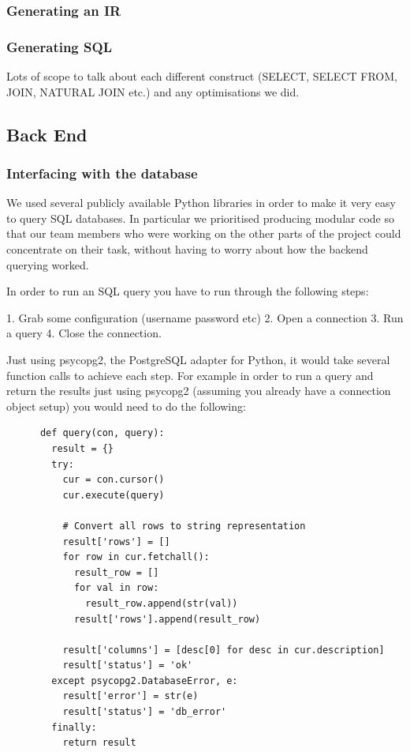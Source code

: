 \documentclass[a4paper, 11pt]{article}
\begin{document}
    \subsubsection{Generating an IR}

    \subsubsection{Generating SQL}
      Lots of scope to talk about each different construct (SELECT, SELECT FROM, 
      JOIN, NATURAL JOIN etc.) and any optimisations we did.

    \subsection{Back End}


    \subsubsection{Interfacing with the database}

      We used several publicly available Python libraries in order to make 
      it very easy to query SQL databases. In particular we prioritised
      producing modular code so that our team members who were working on the
      other parts of the project could concentrate on their task, without having
      to worry about how the backend querying worked.

      In order to run an SQL query you have to run through the following steps:

      1. Grab some configuration (username password etc)
      2. Open a connection
      3. Run a query
      4. Close the connection.

      Just using psycopg2, the PostgreSQL adapter for Python, it would take
      several function calls to achieve each step. For example in order to run a
      query and return the results just using psycopg2 (assuming you already
      have a connection object setup) you would need to do the following:

      \begin{verbatim}
      def query(con, query):
        result = {}
        try:
          cur = con.cursor()
          cur.execute(query)

          # Convert all rows to string representation
          result['rows'] = []
          for row in cur.fetchall():
            result_row = []
            for val in row:
              result_row.append(str(val))
            result['rows'].append(result_row)

          result['columns'] = [desc[0] for desc in cur.description]
          result['status'] = 'ok'
        except psycopg2.DatabaseError, e:
          result['error'] = str(e)
          result['status'] = 'db_error'
        finally:
          return result
      \end{verbatim}
\end{document}
